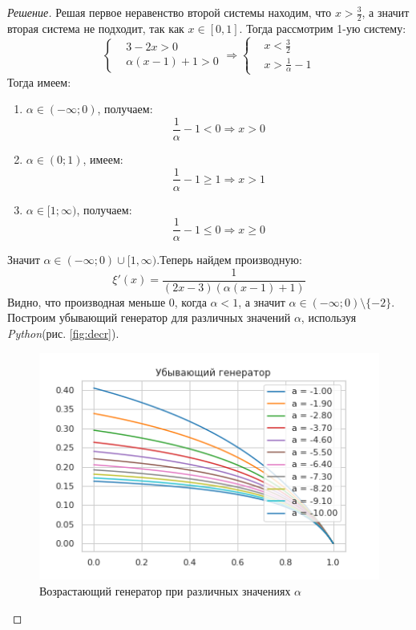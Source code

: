 \documentclass[11pt,a4paper,oneside]{article}
\newenvironment{solution}{
	\begin{proof}[Решение]
		\vspace{-8px}
		\setlength{\parskip}{4px}
		\setlength{\parindent}{0px}
	}{
	\end{proof}
}
\begin{document}
\begin{solution}
		 Решая первое неравенство второй системы находим, что $ x > \frac{3}{2}$, а значит вторая система не подходит, так как $ x \in [0,1]$. Тогда рассмотрим 1-ую систему:
		 \[
		 \left\{
		 \begin{aligned}
		 &3-2x > 0 \\
		 & \alpha(x-1) + 1 > 0
		 \end{aligned}
		 \right.
		 \Rightarrow 
		 \left\{
		 \begin{aligned}
		 &x < \frac{3}{2} \\
		 &x > \frac{1}{\alpha} - 1
		 \end{aligned}
		 \right.
		 \]
		 Тогда имеем:
		 \begin{enumerate}
		 	\item $ \alpha \in (-\infty; 0) $, получаем:
		 	\[
		 	 \frac{1}{\alpha} - 1 < 0 \Rightarrow x > 0
		 	\]
		 	\item $ \alpha \in (0;1) $, имеем:
		 	\[
		 	\frac{1}{\alpha} - 1 \geq 1 \Rightarrow x> 1
		 	\]
		 	\item $ \alpha \in [1; \infty) $, получаем:
		 	\[
		 	 \frac{1}{\alpha} - 1 \leq 0 \Rightarrow x \geq 0
		 	\]
		 \end{enumerate}
		 Значит $ \alpha \in (-\infty; 0) \cup [1, \infty) $.Теперь найдем производную:
		 \[
		 \xi'(x) = \frac{1}{(2x-3)(\alpha(x-1)+1)}
		 \]
		 Видно, что производная меньше $0$, когда $\alpha < 1$, а значит $ \alpha \in (-\infty; 0) \setminus \{ -2 \} $. Построим убывающий генератор для различных значений $\alpha$, используя {\it Python}(рис. \ref{fig:decr}).
		 \begin{figure}[!hbtp]
		 	\centering
		 	\includegraphics[width=\linewidth]{decr.png}
		 	\caption{Возрастающий генератор при различных значениях $\alpha$}

\end{figure}
\end{solution}
\end{document}
